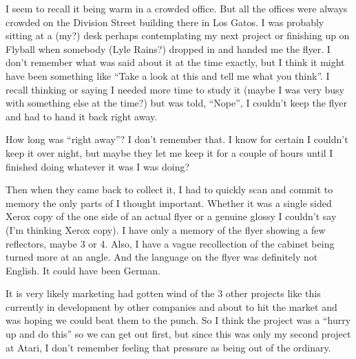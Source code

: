 I seem to recall it being warm in a crowded office. But all the offices were always crowded on the Division Street building there in Los Gatos. I was probably sitting at a (my?) desk perhaps contemplating my next project or finishing up on Flyball when somebody (Lyle Rains?) dropped in and handed me the flyer. I don't remember what was said about it at the time exactly, but I think it might have been something like “Take a look at this and tell me what you think”. I recall thinking or saying I needed more time to study it (maybe I was very busy with something else at the time?) but was told, “Nope”, I couldn't keep the flyer and had to hand it back right away. 

How long was “right away”? I don't remember that. I know for certain I couldn't keep it over night, but maybe they let me keep it for a couple of hours until I finished doing whatever it was I was doing? 

Then when they came back to collect it, I had to quickly scan and commit to memory the only parts of I thought important. Whether it was a single sided Xerox copy of the one side of an actual flyer or a genuine glossy I couldn't say (I'm thinking Xerox copy). I have only a memory of the flyer showing a few reflectors, maybe 3 or 4. Also, I have a vague recollection of the cabinet being turned more at an angle. And the language on the flyer was definitely not English. It could have been German. 

It is very likely marketing had gotten wind of the 3 other projects like this currently in development by other companies and about to hit the market and was hoping we could beat them to the punch. So I think the project was a “hurry up and do this” so we can get out first, but since this was only my second project at Atari, I don't remember feeling that pressure as being out of the ordinary.

